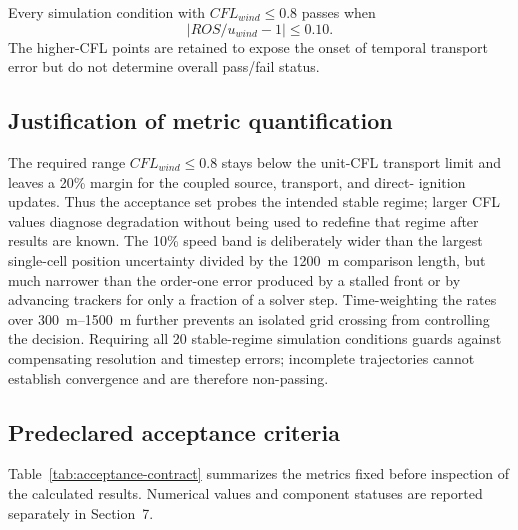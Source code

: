 Every simulation condition with $CFL_{wind}\leq0.8$ passes when
\begin{equation}
  \left|ROS/u_{wind}-1\right|\leq 0.10.
\end{equation}
The higher-CFL points are retained to expose the onset of temporal
transport error but do not determine overall pass/fail status.

\subsection{Justification of metric quantification}

The required range \(CFL_{wind}\le0.8\) stays below the unit-CFL transport
limit and leaves a 20\% margin for the coupled source, transport, and direct-
ignition updates.  Thus the acceptance set probes the intended stable regime;
larger CFL values diagnose degradation without being used to redefine that
regime after results are known.  The 10\% speed band is deliberately wider
than the largest single-cell position uncertainty divided by the
\SI{1200}{m} comparison length, but much narrower than the order-one error
produced by a stalled front or by advancing trackers for only a fraction of a
solver step.  Time-weighting the rates over \SI{300}{m}--\SI{1500}{m} further
prevents an isolated grid crossing from controlling the decision.  Requiring
all 20 stable-regime simulation conditions guards against compensating resolution and
timestep errors; incomplete trajectories cannot establish convergence and are
therefore non-passing.

\subsection{Predeclared acceptance criteria}

Table~\ref{tab:acceptance-contract} summarizes the metrics fixed before
inspection of the calculated results. Numerical values and component statuses
are reported separately in Section~7.


